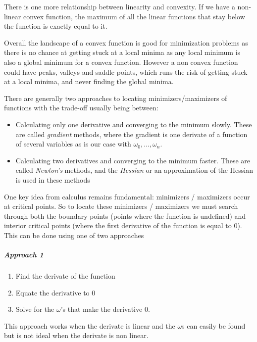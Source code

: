 \documentclass[12pt letter]{report}
\begin{document}
There is one more relationship between linearity and convexity. If we have a non-linear convex function, the maximum of
all the linear functions that stay below the function is exactly equal to it.

Overall the landscape of a convex function is good for minimization problems as there is no chance at getting stuck at a
local minima as any local minimum is also a global minimum for a convex function. However a non convex function could
have peaks, valleys and saddle points, which runs the risk of getting stuck at a local minima, and never finding the
global minima.


There are generally two approaches to locating minimizers/maximizers of functions with the trade-off usually being
between:
\begin{itemize}
  \item Calculating only one derivative and converging to the minimum slowly. These are called \textit{gradient} methods, where
        the gradient is one derivate of a function of several variables as is our case with $\omega_0, \ldots, \omega_n$.
  \item Calculating two derivatives and converging to the minimum faster. These are called \textit{Newton's} methods, and the
        \textit{Hessian} or an approximation of the Hessian is used in these methods
\end{itemize}


One key idea from calculus remains fundamental: minimizers / maximizers occur at critical points. So to locate these
minimizers / maximizers we must search through both the boundary points (points where the function is undefined) and
interior critical points (where the first derivative of the function is equal to 0). This can be done using one of two approaches

\subparagraph{Approach 1}

\begin{enumerate}
  \item Find the derivate of the function
  \item Equate the derivative to 0
  \item Solve for the $\omega$'s that make the derivative 0.
\end{enumerate}

This approach works when the derivate is linear and the $\omega$s can easily be found but is not ideal when the derivate
is non linear.
\end{document}
